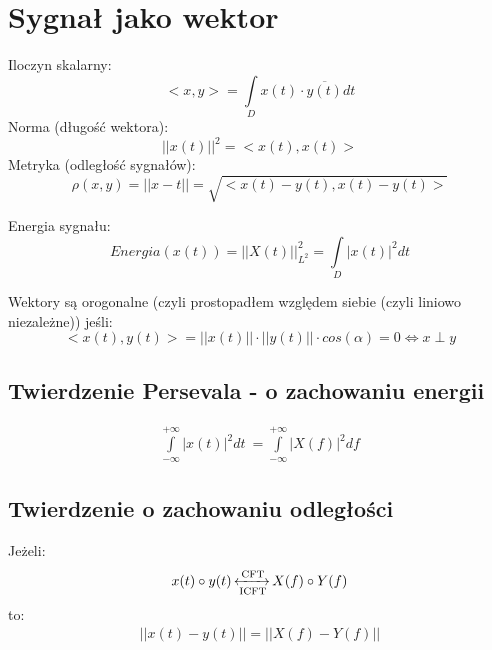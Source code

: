 \section{Sygnał jako wektor}
    Iloczyn skalarny:
    \begin{equation*}
        <x, y> = \int\limits_{D} x(t) \cdot \overline{y(t)} dt
    \end{equation*}
    Norma (długość wektora):
    \begin{equation*}
        ||x(t)||^2 = <x(t), x(t)>
    \end{equation*}
    Metryka (odległość sygnałów):
    \begin{equation*}
        \rho(x,y) = ||x-t|| = \sqrt{<x(t)-y(t), x(t)-y(t)>}
    \end{equation*}

    Energia sygnału:
    \begin{equation*}
        Energia(x(t)) = ||X(t)||^2_{L^2} = \int\limits_D |x(t)|^2dt
    \end{equation*}

    Wektory są orogonalne (czyli prostopadłem względem siebie (czyli liniowo niezależne)) jeśli:
    \begin{equation*}
        <x(t), y(t)> = ||x(t)|| \cdot ||y(t)|| \cdot cos(\alpha) = 0 \Leftrightarrow x\perp y
    \end{equation*}


    \subsection{Twierdzenie Persevala - o zachowaniu energii}
        \begin{gather*}
            \int\limits^{+\infty}_{-\infty}|x(t)|^2 dt\ = \int\limits^{+\infty}_{-\infty}|X(f)|^2df
        \end{gather*}
    \subsection{Twierdzenie o zachowaniu odległości}
        Jeżeli:
        \begin{gather*}
            x(t)\circ y(t) \operatorname{\xleftrightarrow[\text{ICFT}]{\text{CFT}}} X(f)\circ Y(f)
        \end{gather*}
        to:
        \begin{gather*}
            ||x(t) - y(t)|| = ||X(f) - Y(f)||
        \end{gather*}

